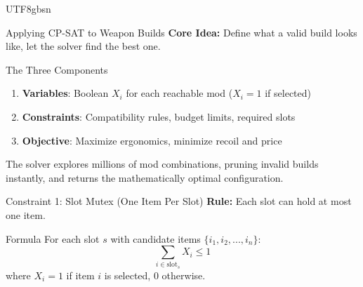 \documentclass[aspectratio=169]{beamer}
\begin{document}
\begin{CJK*}{UTF8}{gbsn}


\begin{frame}{Applying CP-SAT to Weapon Builds}
    \textbf{Core Idea:} Define what a valid build looks like, let the solver find the best one.

    \vspace{0.3cm}
    \begin{block}{The Three Components}
        \begin{enumerate}
            \item \textbf{Variables}: Boolean $X_i$ for each reachable mod ($X_i = 1$ if selected)
            \item \textbf{Constraints}: Compatibility rules, budget limits, required slots
            \item \textbf{Objective}: Maximize ergonomics, minimize recoil and price
        \end{enumerate}
    \end{block}

    \vspace{0.3cm}
    The solver explores millions of mod combinations, pruning invalid builds instantly, and returns the mathematically optimal configuration.
\end{frame}

\begin{frame}{Constraint 1: Slot Mutex (One Item Per Slot)}
    \textbf{Rule:} Each slot can hold at most one item.

    \vspace{0.3cm}
    \begin{block}{Formula}
        For each slot $s$ with candidate items $\{i_1, i_2, ..., i_n\}$:
        \[
        \sum_{i \in \text{slot}_s} X_i \le 1
        \]
        where $X_i = 1$ if item $i$ is selected, $0$ otherwise.
    \end{block}


\end{frame}
\end{CJK*}
\end{document}

